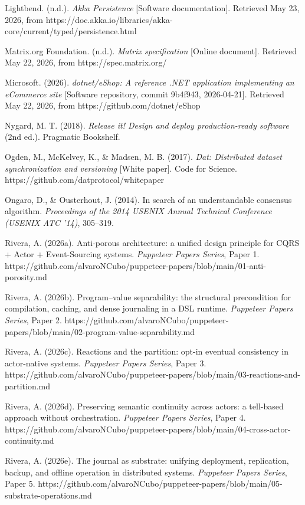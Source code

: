 \documentclass[
]{article}
\begin{document}
Lightbend. (n.d.). \emph{Akka Persistence} {[}Software documentation{]}.
Retrieved May 23, 2026, from
https://doc.akka.io/libraries/akka-core/current/typed/persistence.html

Matrix.org Foundation. (n.d.). \emph{Matrix specification} {[}Online
document{]}. Retrieved May 22, 2026, from https://spec.matrix.org/

Microsoft. (2026). \emph{dotnet/eShop: A reference .NET application
implementing an eCommerce site} {[}Software repository, commit 9b4f943,
2026-04-21{]}. Retrieved May 22, 2026, from
https://github.com/dotnet/eShop

Nygard, M. T. (2018). \emph{Release it! Design and deploy
production-ready software} (2nd ed.). Pragmatic Bookshelf.

Ogden, M., McKelvey, K., \& Madsen, M. B. (2017). \emph{Dat: Distributed
dataset synchronization and versioning} {[}White paper{]}. Code for
Science. https://github.com/datprotocol/whitepaper

Ongaro, D., \& Ousterhout, J. (2014). In search of an understandable
consensus algorithm. \emph{Proceedings of the 2014 USENIX Annual
Technical Conference (USENIX ATC '14)}, 305--319.

Rivera, A. (2026a). Anti-porous architecture: a unified design principle
for CQRS + Actor + Event-Sourcing systems. \emph{Puppeteer Papers
Series}, Paper 1.
https://github.com/alvaroNCubo/puppeteer-papers/blob/main/01-anti-porosity.md

Rivera, A. (2026b). Program--value separability: the structural
precondition for compilation, caching, and dense journaling in a DSL
runtime. \emph{Puppeteer Papers Series}, Paper 2.
https://github.com/alvaroNCubo/puppeteer-papers/blob/main/02-program-value-separability.md

Rivera, A. (2026c). Reactions and the partition: opt-in eventual
consistency in actor-native systems. \emph{Puppeteer Papers Series},
Paper 3.
https://github.com/alvaroNCubo/puppeteer-papers/blob/main/03-reactions-and-partition.md

Rivera, A. (2026d). Preserving semantic continuity across actors: a
tell-based approach without orchestration. \emph{Puppeteer Papers
Series}, Paper 4.
https://github.com/alvaroNCubo/puppeteer-papers/blob/main/04-cross-actor-continuity.md

Rivera, A. (2026e). The journal as substrate: unifying deployment,
replication, backup, and offline operation in distributed systems.
\emph{Puppeteer Papers Series}, Paper 5.
https://github.com/alvaroNCubo/puppeteer-papers/blob/main/05-substrate-operations.md
\end{document}
